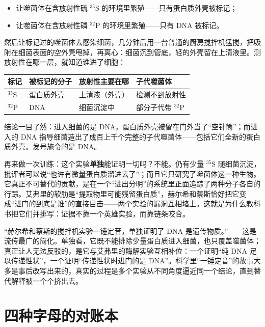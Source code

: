 \begin{itemize}[itemsep=2pt]
\item 让噬菌体在含放射性硫 $^{35}\mathrm{S}$ 的环境里繁殖——只有蛋白质外壳被标记；
\item 让噬菌体在含放射性磷 $^{32}\mathrm{P}$ 的环境里繁殖——只有 DNA 被标记。
\end{itemize}

然后让标记过的噬菌体去感染细菌，几分钟后用一台普通的厨房搅拌机猛搅，把吸附在细菌表面的空外壳甩掉，再离心：细菌沉到管底，轻的外壳留在上清液里。测放射性在哪一层，就知道谁进了细胞：

\begin{table}[htbp]
\centering
\begin{tabular}{llll}
\toprule
标记 & 被标记的分子 & 放射性主要在哪 & 子代噬菌体 \\
\midrule
$^{35}\mathrm{S}$ & 蛋白质外壳 & 上清液（外壳） & 检测不到放射性 \\
$^{32}\mathrm{P}$ & DNA & 细菌沉淀中 & 部分子代带 $^{32}\mathrm{P}$ \\
\bottomrule
\end{tabular}
\end{table}

结论一目了然：进入细菌的是 DNA，蛋白质外壳被留在门外当了“空针筒”；而进入的 DNA 指导细菌造出了成百上千个完整的子代噬菌体——包括它们全新的蛋白质外壳。发号施令的是 DNA。

再来做一次训练：这个实验\textbf{单独}能证明一切吗？不能。仍有少量 $^{35}\mathrm{S}$ 随细菌沉淀，批评者可以说“也许有微量蛋白质溜进去了”；而且它只研究了噬菌体这一种生物。它真正不可替代的贡献，是在一个“进出分明”的系统里正面追踪了两种分子各自的行踪。艾弗里的软肋是“提取物里可能残留蛋白质”，赫尔希和蔡斯恰好把它变成“进门的到底是谁”的直接目击——两个实验的漏洞互相堵上。这就是为什么教科书把它们并排写：证据不靠一个英雄实验，而靠链条咬合。

\begin{wuqu}
“赫尔希和蔡斯的搅拌机实验一锤定音，单独证明了 DNA 是遗传物质。”——这是流传最广的简化。单独看，它既不能排除少量蛋白质进入细菌，也只覆盖噬菌体；真正让人无法反驳的，是它与艾弗里的酶解实验互相补位：一个证明“纯 DNA 足以传递性状”，一个证明“传递性状时进门的是 DNA”。科学里“一锤定音”的故事大多是事后改写出来的，真实的过程是多个实验从不同角度逼近同一个结论，直到替代解释被一个个挤出去。
\end{wuqu}

\section{四种字母的对账本}


